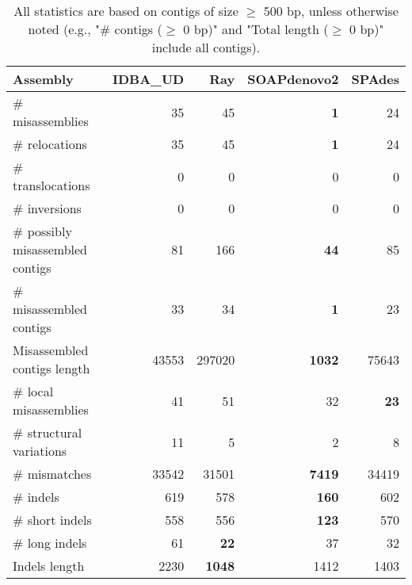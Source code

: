 \documentclass[12pt,a4paper]{article}
\begin{document}
\begin{table}[ht]
\begin{center}
\caption{All statistics are based on contigs of size $\geq$ 500 bp, unless otherwise noted (e.g., "\# contigs ($\geq$ 0 bp)" and "Total length ($\geq$ 0 bp)" include all contigs).}
\begin{tabular}{|l*{4}{|r}|}
\hline
Assembly & IDBA\_UD & Ray & SOAPdenovo2 & SPAdes \\ \hline
\# misassemblies & 35 & 45 & {\bf 1} & 24 \\ \hline
\hspace{5mm}\# relocations & 35 & 45 & {\bf 1} & 24 \\ \hline
\hspace{5mm}\# translocations & 0 & 0 & 0 & 0 \\ \hline
\hspace{5mm}\# inversions & 0 & 0 & 0 & 0 \\ \hline
\# possibly misassembled contigs & 81 & 166 & {\bf 44} & 85 \\ \hline
\# misassembled contigs & 33 & 34 & {\bf 1} & 23 \\ \hline
Misassembled contigs length & 43553 & 297020 & {\bf 1032} & 75643 \\ \hline
\# local misassemblies & 41 & 51 & 32 & {\bf 23} \\ \hline
\# structural variations & 11 & 5 & 2 & 8 \\ \hline
\# mismatches & 33542 & 31501 & {\bf 7419} & 34419 \\ \hline
\# indels & 619 & 578 & {\bf 160} & 602 \\ \hline
\hspace{5mm}\# short indels & 558 & 556 & {\bf 123} & 570 \\ \hline
\hspace{5mm}\# long indels & 61 & {\bf 22} & 37 & 32 \\ \hline
Indels length & 2230 & {\bf 1048} & 1412 & 1403 \\ \hline
\end{tabular}
\end{center}
\end{table}
\end{document}
